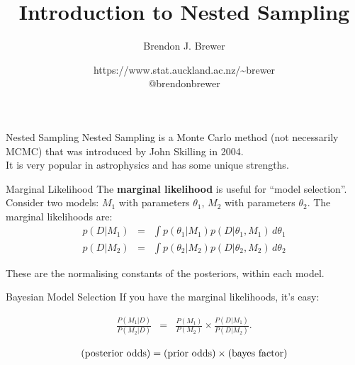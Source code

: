 \documentclass{beamer}
\author{Brendon J. Brewer}
\title{Introduction to Nested Sampling}
\institute{Department of Statistics, The University of Auckland}
\date{{\color{blue} https://www.stat.auckland.ac.nz/\~{ }brewer}\\
\vspace{10pt}
{\color{blue} @brendonbrewer}}
\begin{document}
\begin{frame}[t,plain]
\titlepage
\end{frame}


\begin{frame}[t]{Nested Sampling}
Nested Sampling is a Monte Carlo method (not necessarily MCMC) that was
introduced by John Skilling in 2004.\\
\vspace{20pt}
It is very popular in astrophysics and has some unique strengths.
\end{frame}


\begin{frame}[t]{Marginal Likelihood}
The {\bf marginal likelihood} is useful for ``model selection''. Consider
two models: $M_1$ with parameters $\theta_1$, $M_2$ with parameters $\theta_2$.
The marginal likelihoods are:
\begin{eqnarray*}
p(D | M_1) &=& \int p(\theta_1 | M_1) p(D | \theta_1, M_1) \, d\theta_1\\
p(D | M_2) &=& \int p(\theta_2 | M_2) p(D | \theta_2, M_2) \, d\theta_2
\end{eqnarray*}

These are the normalising constants of the posteriors, within each model.
\end{frame}


\begin{frame}[t]{Bayesian Model Selection}
If you have the marginal likelihoods, it's easy:

\begin{eqnarray*}
\frac{P(M_1 | D)}{P(M_2 | D)} &=& \frac{P(M_1)}{P(M_2)}
\times \frac{P(D | M_1)}{P(D | M_2)}.
\end{eqnarray*}

\begin{eqnarray*}
\textnormal{(posterior odds)} = \textnormal{(prior odds)} \times \textnormal{(bayes factor)}
\end{eqnarray*}

\end{frame}
\end{document}
